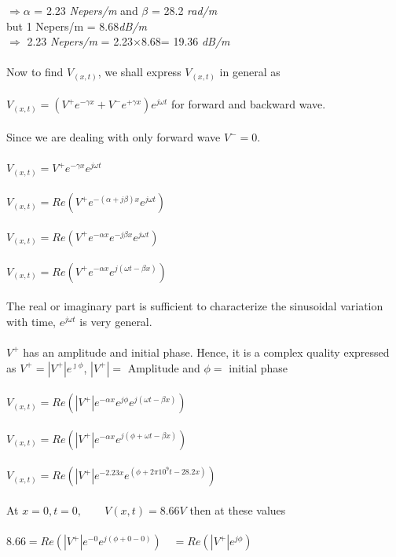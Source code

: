 \begin{exmp}
$\Rightarrow \alpha$ = 2.23 \emph{Nepers/m} and $\beta$ = 28.2 \emph{rad/m}\\
but 1 Nepers/m = 8.68\emph{dB/m}\\
$\Rightarrow$ 2.23 \emph{Nepers/m} = 2.23$\times$8.68= 19.36 \emph{dB/m}\\\\
Now to find $V_{(x,t)}$, we shall express $V_{(x,t)}$ in general as \\\\
$V_{(x,t)} = (V^{+}e^{-\gamma x} + V^{-}e^{+\gamma x})e^{j\omega t}$ for forward and backward wave.\\\\
Since we are dealing with only forward wave $ V^{-} = 0 $.\\\\
$V_{(x,t)} = V^{+}e^{-\gamma x}e^{j\omega t}$\\\\
$V_{(x,t)} = Re({V^{+}e^{-(\alpha +j\beta)x}e^{j\omega t}})$\\\\
$V_{(x,t)} = Re({V^{+}e^{-\alpha x}e^{-j\beta x}e^{j\omega t}})$\\\\
$V_{(x,t)} = Re({V^{+}e^{-\alpha x}e^{j(\omega t - \beta x)}})$\\\\The real or imaginary part is sufficient to characterize the sinusoidal variation with time, ${e^{j\omega t}}$ is very general.\\\\
${V^+}$ has an amplitude and initial phase. Hence, it is a complex quality expressed as $ V^{+} = |V^{+}|e^{\jmath\phi} $, $ |V^{+}| =$ Amplitude and $ \phi =$ initial phase\\\\
$V_{(x,t)} = Re({|V^{+}|e^{-\alpha x}e^{j\phi}e^{j(\omega t - \beta x)}})$\\\\
$V_{(x,t)} = Re({|V^{+}|e^{-\alpha x}e^{j(\phi+\omega t - \beta x)}})$\\\\
$V_{(x,t)} = Re({|V^{+}|e^{-2.23x}e^{(\phi+2\pi10^9t-28.2x)}})$\\\\
At $ x = 0, t = 0, \quad \quad V(x,t) = 8.66V $ then at these values\\\\ 
$8.66 = Re({|V^{+}|e^{-0}e^{j(\phi+0-0)}}) \quad = Re({|V^+|}e^{j\phi})$\\\\

\end{exmp}
